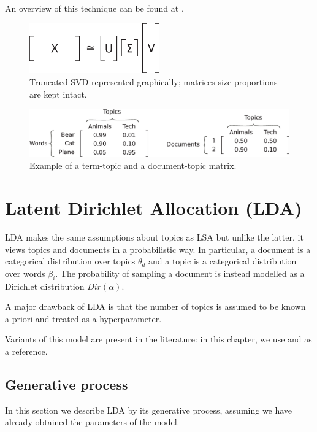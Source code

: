An overview of this technique can be found at \cite{doi:10.1002/aris.1440380105}.

\begin{figure}[ht]
    \centering
    \includegraphics[width=0.5\textwidth]{images/svd.eps}
    \caption{Truncated SVD represented graphically; matrices size proportions are kept intact.}
    \label{fig:svd}
\end{figure}

\begin{figure}[ht]
    \centering
    \includegraphics[width=\textwidth]{images/topic-mat.eps}
    \caption{Example of a term-topic and a document-topic matrix.}
    \label{fig:topicmat}
\end{figure}

\section{Latent Dirichlet Allocation (LDA)}
LDA makes the same assumptions about topics as LSA but unlike the latter, it views topics and documents in a probabilistic way.
In particular, a document is a categorical distribution over topics $\theta_d$ and a topic is a categorical distribution over words $\beta_i$.
The probability of sampling a document is instead modelled as a Dirichlet distribution $Dir(\alpha)$.

A major drawback of LDA is that the number of topics is assumed to be known a-priori and treated as a hyperparameter.

Variants of this model are present in the literature: in this chapter, we use \cite{10.1145/2107736.2107741} and \cite{DBLP:journals/jmlr/BleiNJ03} as a reference.

\subsection{Generative process} \label{gp}
In this section we describe LDA by its generative process, assuming we have already obtained the parameters of the model.

